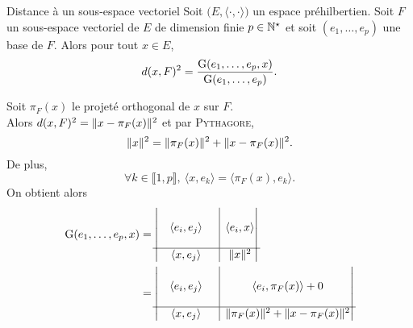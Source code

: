 \begin{theo}{Distance à un sous-espace vectoriel} 
    Soit $\big(E, \langle \cdot , \cdot \rangle \big)$ un espace préhilbertien. Soit $F$ un sous-espace vectoriel de $E$ de dimension finie $p \in \mathbb{N}^\star$ et soit $(e_1, \dots, e_p)$ une base de $F$. Alors pour tout $x \in E$,
    $$d(x, F)^2 = \frac{\mathrm{G}(e_1, \dots, e_p, x)}{\mathrm{G}(e_1, \dots, e_p)}.$$
\end{theo}

\begin{preuve}
    Soit $\pi_F(x)$ le projeté orthogonal de $x$ sur $F$. \\
    Alors $d(x, F)^2 = \Vert x - \pi_F(x) \Vert^2$ et par \textsc{Pythagore},
    $$\Vert x \Vert^2 = \Vert \pi_F(x) \Vert^2 + \Vert x - \pi_F(x) \Vert^2.$$
    De plus, 
    $$\forall k \in \llbracket 1, p \rrbracket,\ \langle x , e_k \rangle = \langle \pi_F(x) , e_k \rangle.$$
    On obtient alors
    \begin{align*}
        \Gram(e_1, \dots, e_p, x) &= 
        \begin{vmatrix}
          \begin{matrix}
            & & \\
            & \langle e_i, e_j \rangle & \\
            & &
          \end{matrix}
          & \rvline & \langle e_i, x \rangle \\
        \hline
          \langle x, e_j \rangle & \rvline &
          \begin{matrix}
          \norme{x}^2
          \end{matrix}
        \end{vmatrix} \\
        &=
        \begin{vmatrix}
          \begin{matrix}
            & & \\
            & \langle e_i, e_j \rangle & \\
            & &
          \end{matrix}
          & \rvline & \langle e_i, \pi_F(x) \rangle + 0 \\
        \hline
          \langle x, e_j \rangle & \rvline &
          \begin{matrix}
          \norme{\pi_F(x)}^2 + \norme{x - \pi_F(x)}^2
          \end{matrix}
        \end{vmatrix} 
    \end{align*}

\end{preuve}
